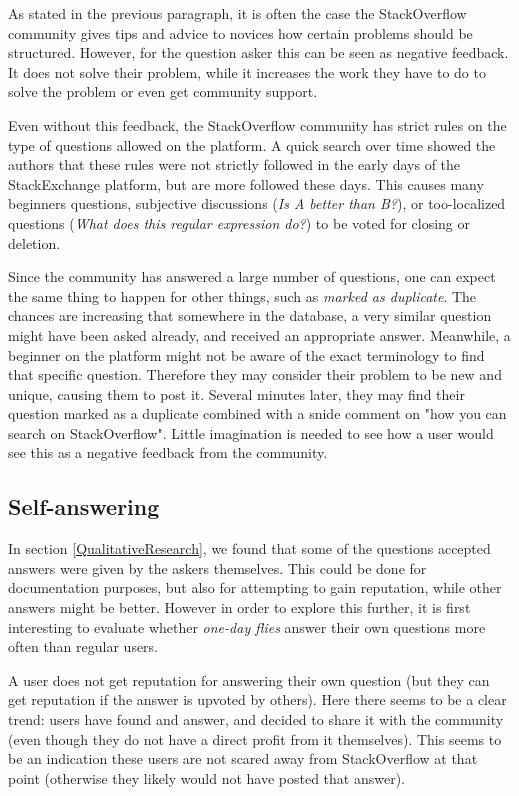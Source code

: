 \documentclass[conference]{IEEEtran}
\newcommand\odf{\emph{one-day flies}\xspace}
\newcommand\ru{regular users\xspace}
\begin{document}
As stated in the previous paragraph, it is often the case the StackOverflow
community gives tips and advice to novices how certain problems should be
structured. However, for the question asker this can be seen as negative
feedback. It does not solve their problem, while it increases the work they
have to do to solve the problem or even get community support.

Even without this feedback, the StackOverflow community has strict rules on the
type of questions allowed on the platform. A quick search over time showed the
authors that these rules were not strictly followed in the early days of the
StackExchange platform, but are more followed these days. This causes many
beginners questions, subjective discussions (\textit{Is A better than B?}), or
too-localized questions (\textit{What does this regular expression do?}) to be
voted for closing or deletion.

Since the community has answered a large number of questions, one can expect
the same thing to happen for other things, such as \textit{marked as
duplicate}. The chances are increasing that somewhere in the database, a very
similar question might have been asked already, and received an appropriate
answer. Meanwhile, a beginner on the platform might not be aware of the exact
terminology to find that specific question. Therefore they may consider their
problem to be new and unique, causing them to post it. Several minutes later,
they may find their question marked as a duplicate combined with a snide
comment on "how you can search on StackOverflow". Little imagination is needed
to see how a user would see this as a negative feedback from the community.


\subsection{Self-answering}
In section \ref{QualitativeResearch}, we found that some of the
questions accepted answers were given by the askers themselves. This
could be done for documentation purposes, but also for attempting to gain
reputation, while other answers might be better. However in order to explore
this further, it is first interesting to evaluate whether \odf answer their 
own questions more often than \ru.

A user does not get reputation for answering their own question (but they can
get reputation if the answer is upvoted by others). Here there seems to be a
clear trend: users have found and answer, and decided to share it with the
community (even though they do not have a direct profit from it themselves).
This seems to be an indication these users are not scared away from
StackOverflow at that point (otherwise they likely would not have posted that
answer). 
\end{document}
